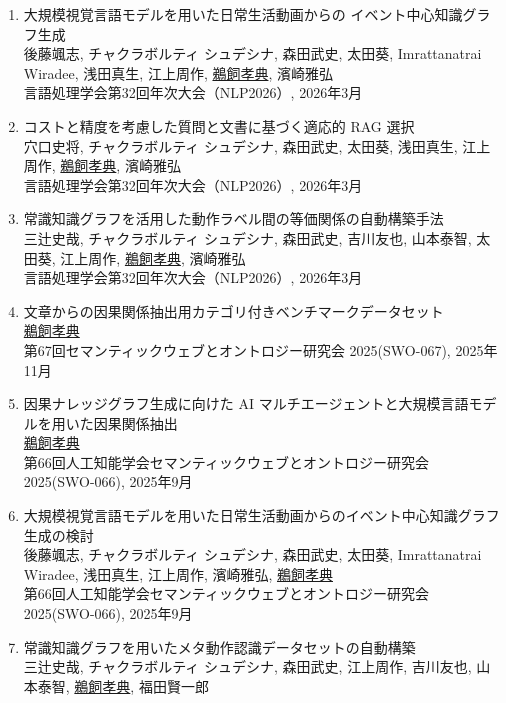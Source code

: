 \documentclass[dvipdfmx]{jlreq}
\begin{document}
\begin{enumerate}
\begin{enumerate}
\begin{enumerate}[label=\arabic*,align=right, labelsep=3pt]
下間宇晟, チャクラボルティ シュデシナ, 森田武史, 太田葵, 浅田真生, 江上周作, \underline{鵜飼孝典}, 濱崎雅弘\\
2026年度人工知能学会全国大会（第40回）, 2026年6月
\item 大規模視覚言語モデルを用いた日常生活動画からの イベント中心知識グラフ生成\\
後藤颯志, チャクラボルティ シュデシナ, 森田武史, 太田葵, Imrattanatrai Wiradee, 浅田真生, 江上周作, \underline{鵜飼孝典}, 濱崎雅弘\\
言語処理学会第32回年次大会（NLP2026）, 2026年3月
\item コストと精度を考慮した質問と文書に基づく適応的 RAG 選択\\
穴口史将, チャクラボルティ シュデシナ, 森田武史, 太田葵, 浅田真生, 江上周作, \underline{鵜飼孝典}, 濱崎雅弘\\
言語処理学会第32回年次大会（NLP2026）, 2026年3月
\item 常識知識グラフを活用した動作ラベル間の等価関係の自動構築手法\\
三辻史哉, チャクラボルティ シュデシナ, 森田武史, 吉川友也, 山本泰智, 太田葵, 江上周作, \underline{鵜飼孝典}, 濱崎雅弘\\
言語処理学会第32回年次大会（NLP2026）, 2026年3月
\item 文章からの因果関係抽出用カテゴリ付きベンチマークデータセット\\
\underline{鵜飼孝典}\\
第67回セマンティックウェブとオントロジー研究会 2025(SWO-067), 2025年11月
\item 因果ナレッジグラフ生成に向けた AI マルチエージェントと大規模言語モデルを用いた因果関係抽出\\
\underline{鵜飼孝典}\\
第66回人工知能学会セマンティックウェブとオントロジー研究会 2025(SWO-066), 2025年9月
\item 大規模視覚言語モデルを用いた日常生活動画からのイベント中心知識グラフ生成の検討\\
後藤颯志, チャクラボルティ シュデシナ, 森田武史, 太田葵, Imrattanatrai Wiradee, 浅田真生, 江上周作, 濱崎雅弘, \underline{鵜飼孝典}\\
第66回人工知能学会セマンティックウェブとオントロジー研究会 2025(SWO-066), 2025年9月
\item 常識知識グラフを用いたメタ動作認識データセットの自動構築\\
三辻史哉, チャクラボルティ シュデシナ, 森田武史, 江上周作, 吉川友也, 山本泰智, \underline{鵜飼孝典}, 福田賢一郎\\

\end{enumerate}
\end{enumerate}
\end{enumerate}
\end{document}
